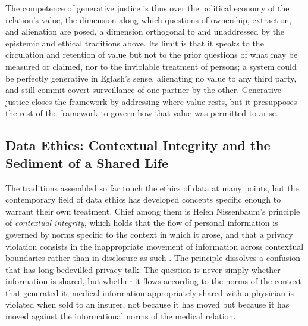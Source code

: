 \documentclass[11pt,a4paper]{article}
\begin{document}
The competence of generative justice is thus over the political economy of the relation's value, the dimension along which questions of ownership, extraction, and alienation are posed, a dimension orthogonal to and unaddressed by the epistemic and ethical traditions above. Its limit is that it speaks to the circulation and retention of value but not to the prior questions of what may be measured or claimed, nor to the inviolable treatment of persons; a system could be perfectly generative in Eglash's sense, alienating no value to any third party, and still commit covert surveillance of one partner by the other. Generative justice closes the framework by addressing where value rests, but it presupposes the rest of the framework to govern how that value was permitted to arise.

\subsection{Data Ethics: Contextual Integrity and the Sediment of a Shared Life}\label{p01:sec:dataethics}

The traditions assembled so far touch the ethics of data at many points, but the contemporary field of data ethics has developed concepts specific enough to warrant their own treatment. Chief among them is Helen Nissenbaum's principle of \emph{contextual integrity}, which holds that the flow of personal information is governed by norms specific to the context in which it arose, and that a privacy violation consists in the inappropriate movement of information across contextual boundaries rather than in disclosure as such \parencite{nissenbaum2010privacy}. The principle dissolves a confusion that has long bedevilled privacy talk. The question is never simply whether information is shared, but whether it flows according to the norms of the context that generated it; medical information appropriately shared with a physician is violated when sold to an insurer, not because it has moved but because it has moved against the informational norms of the medical relation.
\end{document}

